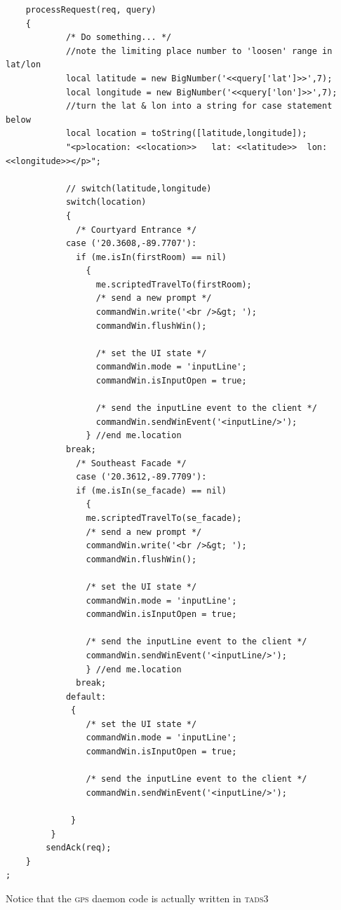 \begin{itemize}[leftmargin=0em]
\begin{lstlisting}
    processRequest(req, query)
    {
            /* Do something... */
            //note the limiting place number to 'loosen' range in lat/lon
            local latitude = new BigNumber('<<query['lat']>>',7);
            local longitude = new BigNumber('<<query['lon']>>',7);
            //turn the lat & lon into a string for case statement below
            local location = toString([latitude,longitude]);
            "<p>location: <<location>>   lat: <<latitude>>  lon: <<longitude>></p>";

            // switch(latitude,longitude)
            switch(location)
            {
              /* Courtyard Entrance */
            case ('20.3608,-89.7707'):
              if (me.isIn(firstRoom) == nil)
                {
                  me.scriptedTravelTo(firstRoom); 
                  /* send a new prompt */
                  commandWin.write('<br />&gt; '); 
                  commandWin.flushWin();

                  /* set the UI state */
                  commandWin.mode = 'inputLine';
                  commandWin.isInputOpen = true;

                  /* send the inputLine event to the client */
                  commandWin.sendWinEvent('<inputLine/>');
                } //end me.location
            break;
              /* Southeast Facade */
              case ('20.3612,-89.7709'): 
              if (me.isIn(se_facade) == nil)
                {
                me.scriptedTravelTo(se_facade);
                /* send a new prompt */
                commandWin.write('<br />&gt; '); 
                commandWin.flushWin();

                /* set the UI state */
                commandWin.mode = 'inputLine';
                commandWin.isInputOpen = true;

                /* send the inputLine event to the client */
                commandWin.sendWinEvent('<inputLine/>');
                } //end me.location
              break;
            default:
             {
                /* set the UI state */
                commandWin.mode = 'inputLine';
                commandWin.isInputOpen = true;

                /* send the inputLine event to the client */
                commandWin.sendWinEvent('<inputLine/>');

             }
         }
        sendAck(req);
    }
;
\end{lstlisting}
\end{itemize}
Notice that the \textsc{gps} daemon code is actually written in \textsc{tads3}

